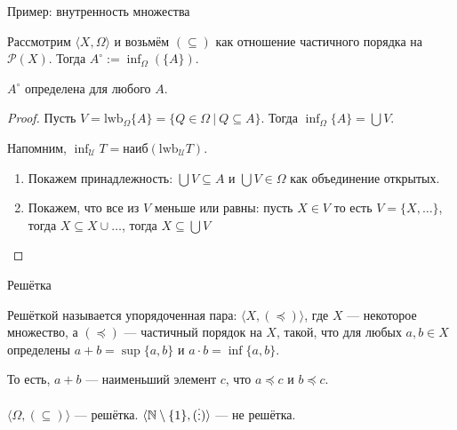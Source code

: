 \documentclass[aspectratio=169]{beamer}
\begin{document}
\begin{frame}{Пример: внутренность множества}
\begin{defrus} Рассмотрим $\langle X, \Omega\rangle$ и возьмём $(\subseteq)$ как отношение частичного порядка на $\mathcal{P}(X)$.
Тогда $A^\circ := \inf_\Omega (\{ A\})$. %
\end{defrus}

\begin{thmrus}$A^\circ$ определена для любого $A$.\end{thmrus}
\begin{proof}

Пусть $V = \text{lwb}_\Omega\{ A \} = \{ Q \in \Omega\ |\ Q \subseteq A\}$. Тогда $\inf_\Omega \{A\} = \bigcup V$.

Напомним, $\inf_\mathcal{U} T = \text{наиб}(\text{lwb}_\mathcal{U} T)$.

\begin{enumerate}
\item Покажем принадлежность: $\bigcup V \subseteq A$ и $\bigcup V \in \Omega$ как объединение открытых.
\item Покажем, что все из $V$ меньше или равны: пусть $X \in V$ то есть $V = \{ X, \dots \}$, тогда $X \subseteq X \cup \dots$, тогда $X \subseteq \bigcup V$
\end{enumerate}
\end{proof}
\end{frame}

\begin{frame}{Решётка}
\begin{defrus}Решёткой называется упорядоченная пара: $\langle X, (\preceq)\rangle$, 
где $X$ --- некоторое множество, а $(\preceq)$ --- частичный порядок на $X$, такой, 
что для любых $a,b \in X$ определены $a + b = \sup\{a,b\}$ и $a \cdot b = \inf\{a,b\}$.
\end{defrus}

То есть, $a + b$ --- наименьший элемент $c$, что $a \preceq c$ и $b \preceq c$.

\begin{exmprus}
$\langle\Omega, (\subseteq)\rangle$ --- решётка.
$\langle\mathbb{N}\setminus\{1\}, (\raisebox{-0.75pt}{\vdots})\rangle$ --- не решётка.
\end{exmprus}
\end{frame}
\end{document}
